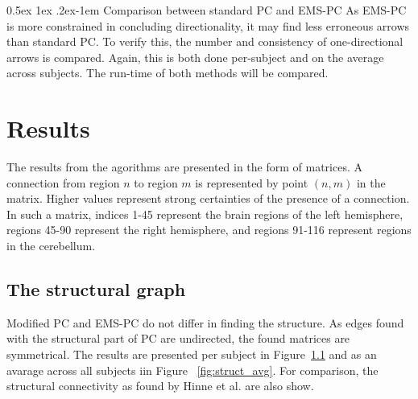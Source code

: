 \documentclass[a4paper, 10pt, english, onecolumn]{article}
\makeatletter
\renewcommand{\paragraph}{%
  \@startsection{paragraph}{4}%
  {\z@}{0.5ex \@plus 1ex \@minus .2ex}{-1em}%
  {\normalfont\normalsize\bfseries}%
}
\makeatother
\begin{document}
\paragraph{Comparison between standard PC and EMS-PC}
As EMS-PC is more constrained in concluding directionality, it may find less erroneous arrows than standard PC.
To verify this, the number and consistency of one-directional arrows is compared.
Again, this is both done per-subject and on the average across subjects.
The run-time of both methods will be compared.


\section{Results}\label{sec:results}


The results from the agorithms are presented in the form of matrices.
A connection from region $n$ to region $m$ is represented by point $(n,m)$ in the matrix.
Higher values represent strong certainties of the presence of a connection.
In such a matrix, indices 1-45 represent the brain regions of the left hemisphere, regions 45-90 represent the right hemisphere, and regions 91-116 represent regions in the cerebellum.

\subsection{The structural graph}
Modified PC and EMS-PC do not differ in finding the structure.
As edges found with the structural part of PC are undirected, the found matrices are symmetrical.
The results are presented per subject in Figure~\ref{} and as an avarage across all subjects iin Figure ~\ref{fig:struct_avg}. %
For comparison, the structural connectivity as found by Hinne et al.\cite{hinne2013} are also show. 
\end{document}
